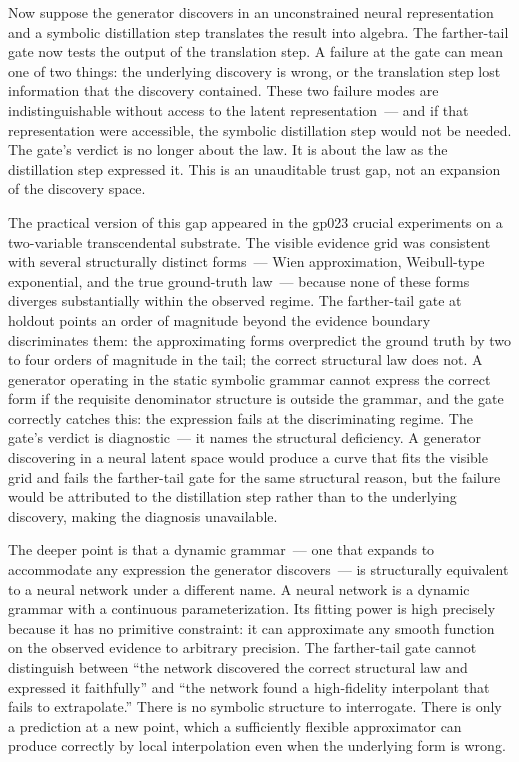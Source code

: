 \documentclass[11pt]{article}
\begin{document}
Now suppose the generator discovers in an unconstrained neural representation and a symbolic distillation step translates the result into algebra. The farther-tail gate now tests the output of the translation step. A failure at the gate can mean one of two things: the underlying discovery is wrong, or the translation step lost information that the discovery contained. These two failure modes are indistinguishable without access to the latent representation~--- and if that representation were accessible, the symbolic distillation step would not be needed. The gate's verdict is no longer about the law. It is about the law as the distillation step expressed it. This is an unauditable trust gap, not an expansion of the discovery space.

The practical version of this gap appeared in the gp023 crucial experiments on a two-variable transcendental substrate. The visible evidence grid was consistent with several structurally distinct forms~--- Wien approximation, Weibull-type exponential, and the true ground-truth law~--- because none of these forms diverges substantially within the observed regime. The farther-tail gate at holdout points an order of magnitude beyond the evidence boundary discriminates them: the approximating forms overpredict the ground truth by two to four orders of magnitude in the tail; the correct structural law does not. A generator operating in the static symbolic grammar cannot express the correct form if the requisite denominator structure is outside the grammar, and the gate correctly catches this: the expression fails at the discriminating regime. The gate's verdict is diagnostic~--- it names the structural deficiency. A generator discovering in a neural latent space would produce a curve that fits the visible grid and fails the farther-tail gate for the same structural reason, but the failure would be attributed to the distillation step rather than to the underlying discovery, making the diagnosis unavailable.

The deeper point is that a dynamic grammar~--- one that expands to accommodate any expression the generator discovers~--- is structurally equivalent to a neural network under a different name. A neural network is a dynamic grammar with a continuous parameterization. Its fitting power is high precisely because it has no primitive constraint: it can approximate any smooth function on the observed evidence to arbitrary precision. The farther-tail gate cannot distinguish between ``the network discovered the correct structural law and expressed it faithfully'' and ``the network found a high-fidelity interpolant that fails to extrapolate.'' There is no symbolic structure to interrogate. There is only a prediction at a new point, which a sufficiently flexible approximator can produce correctly by local interpolation even when the underlying form is wrong.
\end{document}
